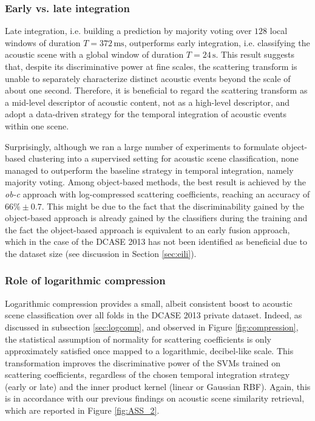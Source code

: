 \documentclass[journal]{IEEEtran}
\makeatletter
\newcommand*{\ie}{i.e.\@\xspace}
\newcommand*{\vs}{vs.\@\xspace}
\makeatother
\begin{document}
\subsubsection*{Early \vs late integration}
Late integration, \ie building a prediction by majority voting over $128$ local windows of duration $T=372\,\mathrm{ms}$, outperforms early integration, \ie classifying the acoustic scene with a global window of duration $T=24\,\mathrm{s}$.
This result suggests that, despite its discriminative power at fine scales, the scattering transform is unable to separately characterize distinct acoustic events beyond the scale of about one second.
Therefore, it is beneficial to regard the scattering transform as a mid-level descriptor of acoustic content, not as a high-level descriptor, and adopt a data-driven strategy for the temporal integration of acoustic events within one scene.

Surprisingly, although we ran a large number of experiments to formulate object-based clustering into a supervised setting for acoustic scene classification, none managed to outperform the baseline strategy in temporal integration, namely majority voting. Among object-based methods, the best result is achieved by the \emph{ob-c} approach with log-compressed scattering coefficients, reaching an accuracy of $66\% \pm0.7$. This might be due to the fact that the discriminability gained by the object-based approach is already gained by the classifiers during the training and the fact the object-based approach is equivalent to an early fusion approach, which in the case of the DCASE 2013 has not been identified as beneficial due to the dataset size (see discussion in Section \ref{sec:eili}).

\subsubsection*{Role of logarithmic compression}

Logarithmic compression provides a small, albeit consistent boost to acoustic scene classification over all folds in the DCASE 2013 private dataset.
Indeed, as discussed in subsection \ref{sec:logcomp}, and observed in Figure \ref{fig:compression}, the statistical assumption of normality for scattering coefficients is only approximately satisfied once mapped to a logarithmic, decibel-like scale.
This transformation improves the discriminative power of the SVMs trained on scattering coefficients, regardless of the chosen temporal integration strategy (early or late) and the inner product kernel (linear or Gaussian RBF).
Again, this is in accordance with our previous findings on acoustic scene similarity retrieval, which are reported in Figure \ref{fig:ASS_2}.
\end{document}
